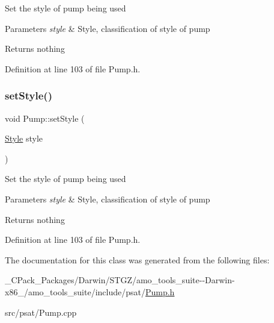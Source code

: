 Set the style of pump being used


\begin{DoxyParams}{Parameters}
{\em style} & Style, classification of style of pump\\
\hline
\end{DoxyParams}
\begin{DoxyReturn}{Returns}
nothing 
\end{DoxyReturn}


Definition at line 103 of file Pump.\+h.

\mbox{\label{class_pump_a4852cb47f40a46ba84c7dff91d1abd53}} 
\subsubsection{\texorpdfstring{set\+Style()}{setStyle()}\hspace{0.1cm}{\footnotesize\ttfamily [3/3]}}
{\footnotesize\ttfamily void Pump\+::set\+Style (\begin{DoxyParamCaption}\item[{\hyperlink{class_pump_aef354601ce4218258cc898b35a1e90ff}{Style}}]{style }\end{DoxyParamCaption})\hspace{0.3cm}{\ttfamily [inline]}}

Set the style of pump being used


\begin{DoxyParams}{Parameters}
{\em style} & Style, classification of style of pump\\
\hline
\end{DoxyParams}
\begin{DoxyReturn}{Returns}
nothing 
\end{DoxyReturn}


Definition at line 103 of file Pump.\+h.



The documentation for this class was generated from the following files\+:\begin{DoxyCompactItemize}
\item 
\+\_\+\+C\+Pack\+\_\+\+Packages/\+Darwin/\+S\+T\+G\+Z/amo\+\_\+tools\+\_\+suite-\/-\/\+Darwin-\/x86\+\_/amo\+\_\+tools\+\_\+suite/include/psat/\hyperlink{___c_pack___packages_2_darwin_2_s_t_g_z_2amo__tools__suite--_darwin-x86__64_2amo__tools__suite_2include_2psat_2_pump_8h}{Pump.\+h}\item 
src/psat/Pump.\+cpp\end{DoxyCompactItemize}
